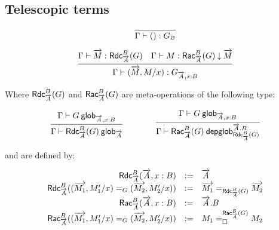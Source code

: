 \subsection{Telescopic terms}

\begin{small}
  \[
  \infer{\ofglob{\Gamma}{()}{G_\varnothing}}{}
  \]

  \[
  \infer{\ofglob{\Gamma}{(\tel{M},M/x)}{G_{\tel A,x:B}}}
  {\ofglob{\Gamma}{\tel M}{\fsttelglob{\tel A}{B}{G}}
    & \ofdepglob{\Gamma}{M}{\sndtelglob{\tel A}{B}{G}}{\tel M}}
  \]
\end{small}

Where $\fsttelglob{\tel A}{B}{G}$ and $\sndtelglob{\tel A}{B}{G}$ are
meta-operations of the following type:

\begin{small}
  \[
  \infer
    {\wfglob{\Gamma}{\fsttelglob{\tel A}{B}{G}}{\tel A}}
    {\wfglob{\Gamma}{G}{\tel A,x:B}}
  \qquad\qquad
  \infer
    {\wfdepglob{\Gamma}{\sndtelglob{\tel A}{B}{G}}
      {\tel A.B}{\fsttelglob{\tel A}{B}{G}}}
    {\wfglob{\Gamma}{G}{\tel A,x:B}}
  \]
\end{small}

and are defined by:

\begin{small}
  \[
  \begin{array}{rcl}
    \fsttelglob{\tel A}{B}{\tel A,x:B} & := & \tel A \\
    \fsttelglob{\tel A}{B}{\homj{G}{(\tel{M_1},M_1'/x)}
      {(\tel{M_2},M_2'/x)}} & := &
      \homj{\fsttelglob{\tel A}{B}{G}}{\tel{M_1}}{\tel{M_2}} \\
    \sndtelglob{\tel A}{B}{\tel A,x:B} & := & \tel A.B \\
    \sndtelglob{\tel A}{B}{\homj{G}{(\tel{M_1},M_1'/x)}
      {(\tel{M_2},M_2'/x)}} & := &
      \dhomj{\sndtelglob{\tel A}{B}{G}}{M_1}{M_2}{\blank}
    \\
  \end{array}
  \]
\end{small}

